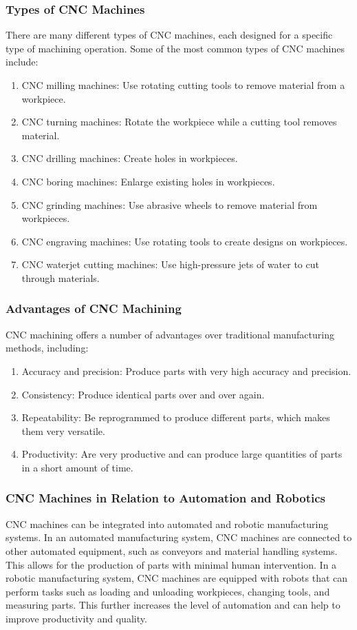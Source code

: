 \documentclass{article}
\begin{document}
\subsubsection{Types of CNC Machines}
There are many different types of CNC machines, each designed for a specific type of machining operation. Some of the most common types of CNC machines include:
\begin{enumerate}
    \item CNC milling machines: Use rotating cutting tools to remove material from a workpiece.
    \item CNC turning machines: Rotate the workpiece while a cutting tool removes material.
    \item CNC drilling machines: Create holes in workpieces.
    \item CNC boring machines: Enlarge existing holes in workpieces.
    \item CNC grinding machines: Use abrasive wheels to remove material from workpieces.
    \item CNC engraving machines: Use rotating tools to create designs on workpieces.
    \item CNC waterjet cutting machines: Use high-pressure jets of water to cut through materials.
\end{enumerate}

\subsubsection{Advantages of CNC Machining}
CNC machining offers a number of advantages over traditional manufacturing methods, including:
\begin{enumerate}
    \item Accuracy and precision: Produce parts with very high accuracy and precision.
    \item Consistency: Produce identical parts over and over again.
    \item Repeatability: Be reprogrammed to produce different parts, which makes them very versatile.
    \item Productivity: Are very productive and can produce large quantities of parts in a short amount of time.
\end{enumerate}

\subsubsection{CNC Machines in Relation to Automation and Robotics}
CNC machines can be integrated into automated and robotic manufacturing systems. In an automated manufacturing system, CNC machines are connected to other automated equipment, such as conveyors and material handling systems. This allows for the production of parts with minimal human intervention. In a robotic manufacturing system, CNC machines are equipped with robots that can perform tasks such as loading and unloading workpieces, changing tools, and measuring parts. This further increases the level of automation and can help to improve productivity and quality.
\end{document}
